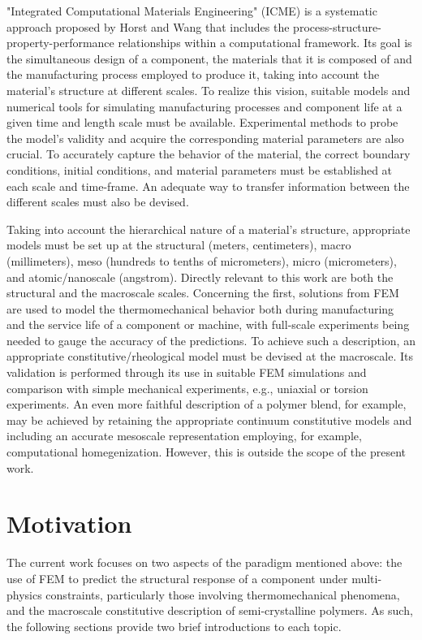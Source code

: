 "Integrated Computational Materials Engineering" (ICME) is a systematic approach proposed by Horst and Wang \citep{horstemeyerCradletograveSimulationbasedDesign2003} that includes the process-structure-property-performance relationships within a computational framework.
Its goal is the simultaneous design of a component, the materials that it is composed of and the manufacturing process employed to produce it, taking into account the material's structure at different scales.
To realize this vision, suitable models and numerical tools for simulating manufacturing processes and component life at a given time and length scale must be available.
Experimental methods to probe the model's validity and acquire the corresponding material parameters are also crucial.
To accurately capture the behavior of the material, the correct boundary conditions, initial conditions, and material parameters must be established at each scale and time-frame.
An adequate way to transfer information between the different scales must also be devised.

Taking into account the hierarchical nature of a material's structure, appropriate models must be set up at the structural (meters, centimeters), macro (millimeters), meso (hundreds to tenths of micrometers), micro (micrometers), and atomic/nanoscale (angstrom).
Directly relevant to this work are both the structural and the macroscale scales.
Concerning the first, solutions from FEM are used to model the thermomechanical behavior both during manufacturing and the service life of a component or machine, with full-scale experiments being needed to gauge the accuracy of the predictions.
To achieve such a description, an appropriate constitutive/rheological model must be devised at the macroscale.
Its validation is performed through its use in suitable FEM simulations and comparison with simple mechanical experiments, e.g., uniaxial or torsion experiments.
An even more faithful description of a polymer blend, for example, may be achieved by retaining the appropriate continuum constitutive models and including an accurate mesoscale representation employing, for example, computational homegenization.
However, this is outside the scope of the present work.

\section{Motivation}

The current work focuses on two aspects of the paradigm mentioned above: the use of FEM to predict the structural response of a component under multi-physics constraints, particularly those involving thermomechanical phenomena, and the macroscale constitutive description of semi-crystalline polymers.
As such, the following sections provide two brief introductions to each topic.

